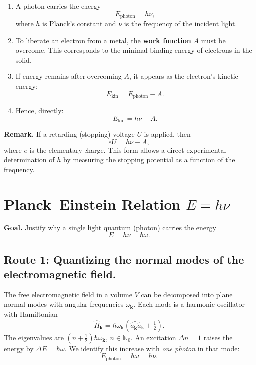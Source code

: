 \begin{enumerate}
	\item A photon carries the energy
	\[
	E_{\text{photon}} = h \nu,
	\]
	where \( h \) is Planck’s constant and \( \nu \) is the frequency of the incident light.
	
	\item To liberate an electron from a metal, the \textbf{work function} \( A \) must be overcome. This corresponds to the minimal binding energy of electrons in the solid.
	
	\item If energy remains after overcoming \( A \), it appears as the electron’s kinetic energy:
	\[
	E_{\text{kin}} = E_{\text{photon}} - A.
	\]
	
	\item Hence, directly:
	\[
	E_{\text{kin}} = h \nu - A.
	\]
\end{enumerate}

\textbf{Remark.}  
If a retarding (stopping) voltage \( U \) is applied, then
\[
eU = h \nu - A,
\]
where \( e \) is the elementary charge. This form allows a direct experimental determination of \( h \) by measuring the stopping potential as a function of the frequency.

\section{Planck–Einstein Relation \texorpdfstring{$E = h\nu$}{E = hν}}
\label{anhangA:planckEinstein}

\textbf{Goal.} Justify why a single light quantum (photon) carries the energy
\[
E = h\nu = \hbar \omega .
\]

\subsection*{Route 1: Quantizing the normal modes of the electromagnetic field.}
The free electromagnetic field in a volume \(V\) can be decomposed into plane normal modes with angular frequencies \(\omega_{\mathbf{k}}\). Each mode is a harmonic oscillator with Hamiltonian
\[
\hat H_{\mathbf{k}}=\hbar \omega_{\mathbf{k}}\!\left(\hat a_{\mathbf{k}}^\dagger \hat a_{\mathbf{k}}+\tfrac12\right).
\]
The eigenvalues are \((n+\tfrac12)\hbar\omega_{\mathbf{k}}\), \(n\in \mathbb{N}_0\). 
An excitation \(\Delta n = 1\) raises the energy by \(\Delta E = \hbar \omega\). 
We identify this increase with \emph{one photon} in that mode:
\[
E_{\text{photon}}=\hbar\omega=h\nu.
\]


